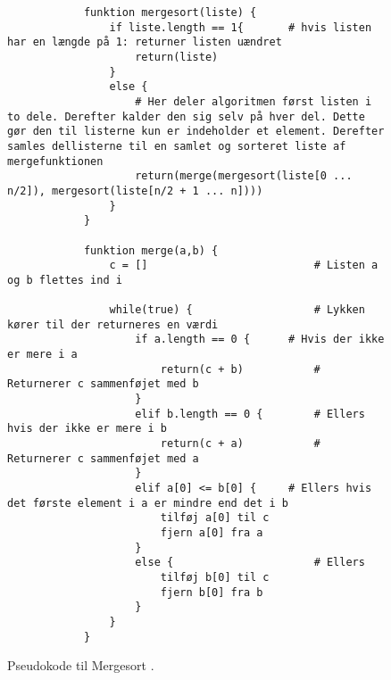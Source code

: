 \begin{figure}
	\begin{center}
		\begin{lstlisting}
			funktion mergesort(liste) {
				if liste.length == 1{ 		# hvis listen har en længde på 1: returner listen uændret
					return(liste)
				}
				else {
					# Her deler algoritmen først listen i to dele. Derefter kalder den sig selv på hver del. Dette gør den til listerne kun er indeholder et element. Derefter samles dellisterne til en samlet og sorteret liste af mergefunktionen
					return(merge(mergesort(liste[0 ... n/2]), mergesort(liste[n/2 + 1 ... n])))
				}
			}

			funktion merge(a,b) {
				c = []							# Listen a og b flettes ind i

				while(true) {					# Lykken kører til der returneres en værdi 
					if a.length == 0 {		# Hvis der ikke er mere i a
						return(c + b)			# Returnerer c sammenføjet med b
					}
					elif b.length == 0 {		# Ellers hvis der ikke er mere i b
						return(c + a)			# Returnerer c sammenføjet med a
					}
					elif a[0] <= b[0] {		# Ellers hvis det første element i a er mindre end det i b
						tilføj a[0] til c
						fjern a[0] fra a
					}
					else {						# Ellers
						tilføj b[0] til c
						fjern b[0] fra b
					}
				}
			}

		\end{lstlisting}
	\end{center}
	\vspace{-5mm}
	\caption{Pseudokode til Mergesort \cite[s. 106]{aogd}.}
	\label{fig:Pseudokode til mergesort}
\end{figure}




